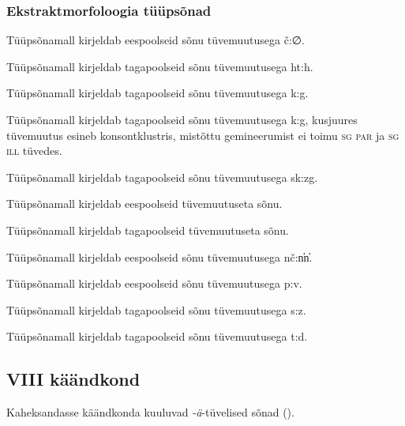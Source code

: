 \documentclass[12pt,a4paper]{article}
\newcommand{\vadja}[1]{\textit{#1}}
\newcommand{\msd}[1]{\textsc{#1}}
\begin{document}
\subsubsection*{Ekstraktmorfoloogia tüüpsõnad}
\vspace{-3.5em}

Tüüpsõna\-mall kirjeldab eespoolseid sõnu tüvemuutusega č:∅.

Tüüpsõna\-mall kirjeldab tagapoolseid sõnu tüvemuutusega ht:h.

Tüüpsõna\-mall kirjeldab tagapoolseid sõnu tüvemuutusega k:g.

Tüüpsõna\-mall kirjeldab tagapoolseid sõnu tüvemuutusega k:g, kusjuures tüvemuutus esineb konsont\-klustris, mistõttu gemineerumist ei toimu \msd{sg par} ja \msd{sg ill} tüvedes.

Tüüpsõna\-mall kirjeldab tagapoolseid sõnu tüvemuutusega sk:zg.

Tüüpsõna\-mall kirjeldab eespoolseid tüvemuutuseta sõnu.

Tüüpsõna\-mall kirjeldab tagapoolseid tüvemuutuseta sõnu.

Tüüpsõna\-mall kirjeldab eespoolseid sõnu tüvemuutusega nč:n̕n̕.

Tüüpsõna\-mall kirjeldab eespoolseid sõnu tüvemuutusega p:v.

Tüüpsõna\-mall kirjeldab tagapoolseid sõnu tüvemuutusega s:z.

Tüüpsõna\-mall kirjeldab tagapoolseid sõnu tüvemuutusega t:d.


\subsection{\RN{8} käändkond}

Kaheksandasse käändkonda kuuluvad \vadja{-ä}-tüvelised sõnad (\cite[46]{ariste_grammar_1968}).

\end{document}
